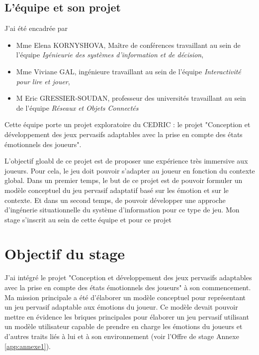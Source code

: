 \documentclass{article}
\begin{document}
	\subsection{L'équipe et son projet}
		J'ai été encadrée par 
		\begin{itemize}
			\item Mme Elena KORNYSHOVA, Maître de conférences travaillant au sein de l'équipe \textit{Igénieurie des systèmes d'information et de décision}, 
			\item Mme Viviane GAL, ingénieure travaillant au sein de l'équipe \textit{Interactivité pour lire et jouer},
			\item M Eric GRESSIER-SOUDAN, professeur des universités travaillant au sein de l'équipe \textit{Réseaux et Objets Connectés}
		\end{itemize}
		Cette équipe porte un projet exploratoire du CEDRIC : le projet "Conception et développement des jeux pervasifs adaptables avec la prise en compte des états émotionnels des joueurs".\par
		L'objectif gloabl de ce projet est de proposer une expérience très immersive aux joueurs. Pour cela, le jeu doit pouvoir s'adapter au joueur en fonction du contexte global.
		Dans un premier temps, le but de ce projet est de pouvoir formuler un modèle conceptuel du jeu pervasif adaptatif basé sur les émotion et sur le contexte. Et dans un second temps, de pouvoir développer une approche d'ingénerie situationnelle du système d'information pour ce type de jeu.\newline
		Mon stage s'inscrit au sein de cette équipe et pour ce projet 

\section{Objectif du stage}
	J'ai intégré le projet "Conception et développement des jeux pervasifs adaptables avec la prise en compte des états émotionnels des joueurs" à son commencement. Ma mission principale a été d'élaborer un modèle conceptuel pour représentant un jeu pervasif adaptable aux émotions du joueur.
	Ce modèle devait pouvoir mettre en évidence les briques principales pour élaborer un jeu pervasif utilisant un modèle utilisateur capable de prendre en charge les émotions du joueurs et d'autres traits liés à lui et à son environnement (voir l'Offre de stage Annexe \ref{app:annexe1}).
\end{document}
